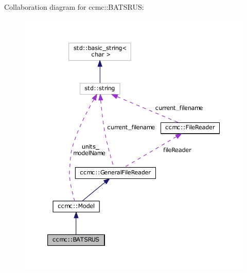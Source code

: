 Collaboration diagram for ccmc\-:\-:B\-A\-T\-S\-R\-U\-S\-:\nopagebreak
\begin{figure}[H]
\begin{center}
\leavevmode
\includegraphics[width=350pt]{classccmc_1_1_b_a_t_s_r_u_s__coll__graph}
\end{center}
\end{figure}
